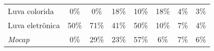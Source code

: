 \begin{table}[ht!]
{\begin{tabular}{l|ccccccc}
            Luva colorida                                                                                        & 0\%                                                        & 0\%                                                     & \cellcolor[HTML]{FFF0D1}18\%                            & \cellcolor[HTML]{FFF6E5}10\%                            & \cellcolor[HTML]{FFF0D1}18\%                            & \cellcolor[HTML]{FFFCF5}4\%                             & \cellcolor[HTML]{FFFCF7}3\%                             \\
            Luva eletrônica                                                                                      & \cellcolor[HTML]{FFD47F}50\%                               & \cellcolor[HTML]{FFC249}71\%                            & \cellcolor[HTML]{FFDC96}41\%                            & \cellcolor[HTML]{FFD47F}50\%                            & \cellcolor[HTML]{FFF6E5}10\%                            & \cellcolor[HTML]{FFF9ED}7\%                             & \cellcolor[HTML]{FFFCF5}4\%                             \\
            \textit{Mocap}                                                                                       & 0\%                                                        & \cellcolor[HTML]{FFE6B5}29\%                            & \cellcolor[HTML]{FFEBC4}23\%                            & \cellcolor[HTML]{FFCE6D}57\%                            & \cellcolor[HTML]{FFFAF0}6\%                             & \cellcolor[HTML]{FFF9ED}7\%                             & \cellcolor[HTML]{FFFAF0}6\%                             \\ \hline
        \end{tabular}%
    }
\end{table}